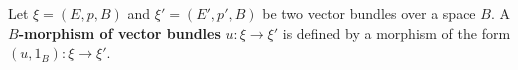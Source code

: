 Let $\xi = (E,p,B)$ and $\xi' = (E',p',B)$ be two vector bundles over a space $B$. A \textbf{$B$-morphism of vector bundles} $u: \xi \to \xi'$ is defined by a morphism of the form $(u, 1_B): \xi \to \xi'$.

